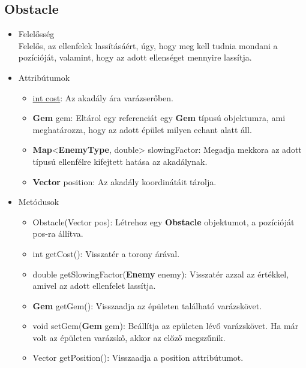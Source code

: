 \subsection{Obstacle}
\begin{itemize}
\item Felelősség\\
Felelős, az ellenfelek lassításáért, úgy, hogy meg kell tudnia mondani a pozícióját, valamint, hogy az adott ellenséget mennyire lassítja.
\item Attribútumok
	\begin{itemize}
		\item \underline{int cost}: Az akadály ára varázserőben.
		\item \textbf{Gem} gem: Eltárol egy referenciát egy \textbf{Gem} típusú objektumra, ami meghatározza, hogy az adott épület milyen echant alatt áll.
		\item \textbf{Map}<\textbf{EnemyType}, double> slowingFactor: Megadja mekkora az adott típusú ellenfélre kifejtett hatása az akadálynak.
		\item \textbf{Vector} position: Az akadály koordinátáit tárolja.
	\end{itemize}
\item Metódusok
	\begin{itemize}
		\item Obstacle(Vector pos): Létrehoz egy \textbf{Obstacle} objektumot, a pozícióját pos-ra állítva.
		\item int getCost(): Visszatér a torony árával.
		\item double getSlowingFactor(\textbf{Enemy} enemy): Visszatér azzal az értékkel, amivel az adott ellenfelet lassítja.
		\item \textbf{Gem} getGem(): Visszaadja az épületen található varázskövet.
		\item void setGem(\textbf{Gem} gem): Beállítja az epületen lévő varázskövet. Ha már volt az épületen varázskő, akkor az előző megszűnik.
		\item Vector getPosition(): Visszaadja a position attribútumot.
	\end{itemize}
\end{itemize}


